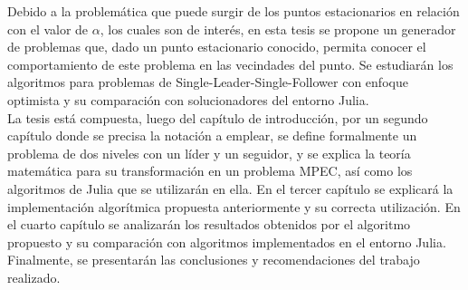 Debido a la problemática que puede surgir de los puntos estacionarios en relación con el valor de $\alpha$, los cuales son de interés, en esta tesis se propone un generador de problemas que, dado un punto estacionario conocido, permita conocer el comportamiento de este problema en las vecindades del punto. Se estudiarán los algoritmos para problemas de Single-Leader-Single-Follower con enfoque optimista y su comparación con solucionadores del entorno Julia.\\
La tesis está compuesta, luego del capítulo de introducción, por un segundo capítulo donde se precisa la notación a emplear, se define formalmente un problema de dos niveles con un líder y un seguidor, y se explica la teoría matemática para su transformación en un problema MPEC, así como los algoritmos de Julia que se utilizarán en ella.
En el tercer capítulo se explicará la implementación algorítmica propuesta anteriormente y su correcta utilización. 
En el cuarto capítulo se analizarán los resultados obtenidos por el algoritmo propuesto y su comparación con algoritmos implementados en el entorno Julia.
Finalmente, se presentarán las conclusiones y recomendaciones del trabajo realizado.